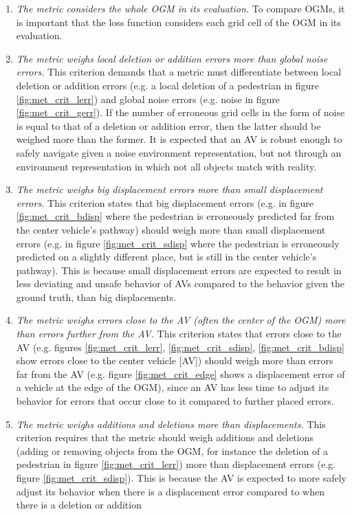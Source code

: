 \begin{enumerate}
	\item \textit{The metric considers the whole \gls{OGM} in its evaluation.} To compare \glspl{OGM}, it is important that the loss function considers each grid cell of the \gls{OGM} in its evaluation.
	\item \textit{The metric weighs local deletion or addition errors more than global noise errors.} This criterion demands that a metric must differentiate between local deletion or addition errors (e.g. a local deletion of a pedestrian in figure \ref{fig:met_crit_lerr}) and global noise errors (e.g. noise in figure \ref{fig:met_crit_gerr}). If the number of erroneous grid cells in the form of noise is equal to that of a deletion or addition error, then the latter should be weighed more than the former. It is expected that an \gls{AV} is robust enough to safely navigate given a noise environment representation, but not through an environment representation in which not all objects match with reality. 
	\item \textit{The metric weighs big displacement errors more than small displacement errors.} This criterion states that big displacement errors (e.g. in figure \ref{fig:met_crit_bdisp} where the pedestrian is erroneously predicted far from the center vehicle's pathway) should weigh more than small displacement errors (e.g. in figure \ref{fig:met_crit_sdisp} where the pedestrian is erroneously predicted on a slightly different place, but is still in the center vehicle's pathway). This is because small displacement errors are expected to result in less deviating and unsafe behavior of \glspl{AV} compared to the behavior given the ground truth, than big displacements.
	\item \textit{The metric weighs errors close to the \gls{AV} (often the center of the \gls{OGM}) more than errors further from the \gls{AV}.} This criterion states that errors close to the \gls{AV} (e.g. figures \ref{fig:met_crit_lerr}, \ref{fig:met_crit_sdisp}, \ref{fig:met_crit_bdisp} show errors close to the center vehicle [\gls{AV}]) should weigh more than errors far from the \gls{AV} (e.g. figure \ref{fig:met_crit_edge} shows a displacement error of a vehicle at the edge of the \gls{OGM}), since an \gls{AV} has less time to adjust its behavior for errors that occur close to it compared to further placed errors.
	\item \textit{The metric weighs additions and deletions more than displacements.} This criterion requires that the metric should weigh additions and deletions (adding or removing objects from the \gls{OGM}, for instance the deletion of a pedestrian in figure \ref{fig:met_crit_lerr}) more than displacement errors (e.g. figure \ref{fig:met_crit_sdisp}). This is because the \gls{AV} is expected to more safely adjust its behavior when there is a displacement error compared to when there is a deletion or addition
\end{enumerate}


